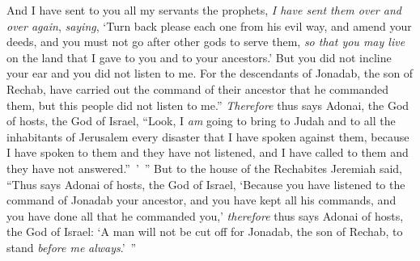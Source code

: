 \begin{biblechapter}
\verse And I have sent to you all my servants the prophets, \textit{I have sent them over and over again}, \textit{saying}, ‘Turn back please each one from his evil way, and amend your deeds, and you must not go after other gods to serve them, \textit{so that you may live} on the land that I gave to you and to your ancestors.’ But you did not incline your ear and you did not listen to me.
\verse For the descendants of Jonadab, the son of Rechab, have carried out the command of their ancestor that he commanded them, but this people did not listen to me.”
\verse \textit{Therefore} thus says Adonai, the God of hosts, the God of Israel, “Look, I \textit{am} going to bring to Judah and to all the inhabitants of Jerusalem every disaster that I have spoken against them, because I have spoken to them and they have not listened, and I have called to them and they have not answered.” ’ ”
\verse But to the house of the Rechabites Jeremiah said, “Thus says Adonai of hosts, the God of Israel, ‘Because you have listened to the command of Jonadab your ancestor, and you have kept all his commands, and you have done all that he commanded you,’
\verse \textit{therefore} thus says Adonai of hosts, the God of Israel: ‘A man will not be cut off for Jonadab, the son of Rechab, to stand \textit{before me} \textit{always}.’ ”
\end{biblechapter}

